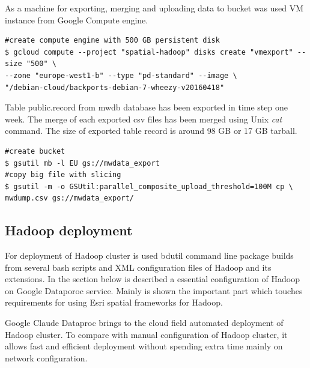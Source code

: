 \documentclass[a4paper,12pt,oneside]{report}
\begin{document}
As a machine for exporting, merging and uploading data to bucket was used VM instance from Google Compute engine.

\begin{footnotesize}\begin{lstlisting}[style=mybash]
#create compute engine with 500 GB persistent disk
$ gcloud compute --project "spatial-hadoop" disks create "vmexport" --size "500" \
--zone "europe-west1-b" --type "pd-standard" --image \
"/debian-cloud/backports-debian-7-wheezy-v20160418"
\end{lstlisting}\end{footnotesize}
 
Table public.record from mwdb database has been exported in time step one week. The merge of each exported 
csv files has been merged using Unix \textit{cat} command. The size of exported table record is around 98 GB or 17 GB tarball.


\begin{footnotesize}\begin{lstlisting}[style=mybash]
#create bucket 
$ gsutil mb -l EU gs://mwdata_export
#copy big file with slicing
$ gsutil -m -o GSUtil:parallel_composite_upload_threshold=100M cp \
mwdump.csv gs://mwdata_export/
\end{lstlisting}\end{footnotesize}
 


        \subsection{Hadoop deployment}
        
For deployment of Hadoop cluster is used bdutil command line package builds from several bash scripts 
and XML configuration files of Hadoop and its extensions. In the section below is described a essential 
configuration of Hadoop on Google Dataporoc 
service. Mainly is shown the important part which touches requirements for using Esri spatial frameworks for Hadoop. 

Google Claude Dataproc brings to the cloud field automated deployment of Hadoop cluster. To compare 
with manual configuration of Hadoop cluster, it allows fast and efficient deployment without spending 
extra time mainly on network configuration.
\end{document}
